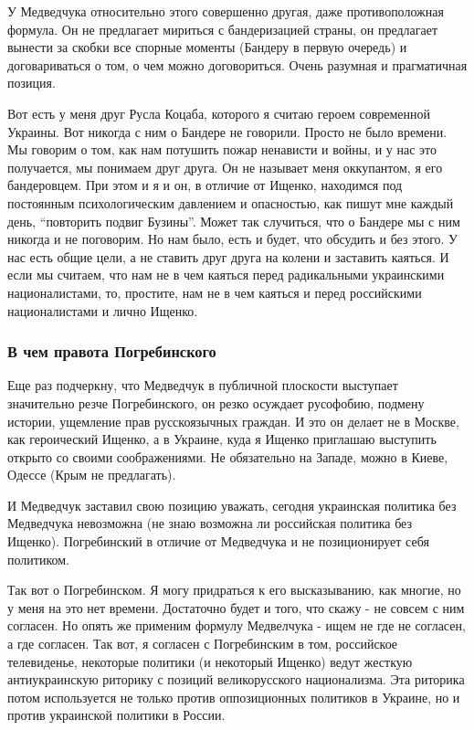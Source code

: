 У Медведчука относительно этого совершенно другая, даже противоположная
формула. Он не предлагает мириться с бандеризацией страны, он предлагает
вынести за скобки все спорные моменты (Бандеру в первую очередь) и
договариваться о том, о чем можно договориться. Очень разумная и прагматичная
позиция. 

Вот есть у меня друг Русла Коцаба, которого я считаю героем современной
Украины. Вот никогда с ним о Бандере не говорили. Просто не было времени. Мы
говорим о том, как нам потушить пожар ненависти и войны, и у нас это
получается, мы понимаем друг друга. Он не называет меня оккупантом, я его
бандеровцем. При этом и я и он, в отличие от Ищенко, находимся под постоянным
психологическим давлением и опасностью, как пишут мне каждый день, \enquote{повторить
подвиг Бузины}.  Может так случиться, что о Бандере мы с ним никогда и не
поговорим. Но нам было, есть и будет, что обсудить и без этого. У нас есть
общие цели, а не ставить друг друга на колени и заставить каяться. И если мы
считаем, что нам не в чем каяться перед радикальными украинскими
националистами, то, простите, нам не в чем каяться и перед российскими
националистами и лично Ищенко. 

\subsubsection{В чем правота Погребинского}

Еще раз подчеркну, что Медведчук в публичной плоскости выступает значительно
резче Погребинского, он резко осуждает русофобию, подмену истории, ущемление
прав русскоязычных граждан. И это он делает не в Москве, как героический
Ищенко, а в Украине, куда я Ищенко приглашаю выступить открыто со своими
соображениями. Не обязательно на Западе, можно в Киеве, Одессе (Крым не
предлагать). 

И Медведчук заставил свою позицию уважать, сегодня украинская политика без
Медведчука невозможна (не знаю возможна ли российская политика без Ищенко).
Погребинский в отличие от Медведчука и не позиционирует себя политиком. 

Так вот о Погребинском. Я могу придраться к его высказыванию, как многие, но у
меня на это нет времени. Достаточно будет и того, что скажу - не совсем с ним
согласен. Но опять же применим формулу Медвелчука - ищем не где не согласен, а
где согласен. Так вот, я согласен с Погребинским в том, российское телевиденье,
некоторые политики (и некоторый Ищенко) ведут жесткую антиукраинскую риторику с
позиций великорусского национализма. Эта риторика потом используется не только
против оппозиционных политиков в Украине, но и против украинской политики в
России. 

